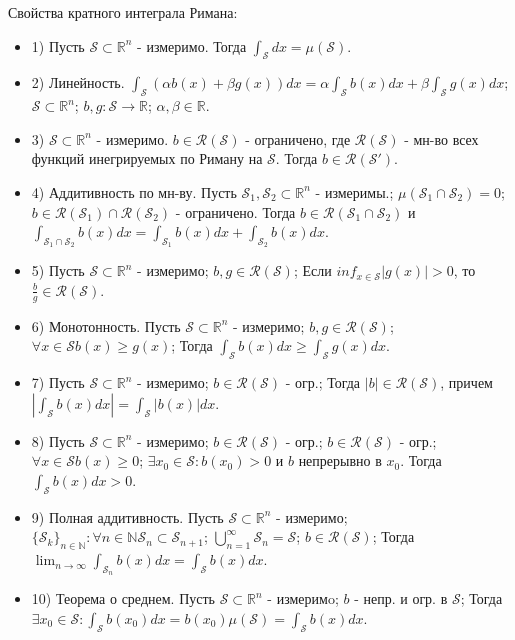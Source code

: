 \documentclass[unicode,10pt, landscape]{article}
\begin{document}
\begin{multicols}{4}
 Свойства кратного интеграла Римана:
 \begin{itemize}
  \item 1) Пусть $\mathcal{S} \subset \mathbb{R}^n$ - измеримо. Тогда $\int_{\mathcal{S}}dx = \mu(\mathcal{S})$.
  \item 2) Линейность. $\int_{\mathcal{S}}(\alpha b(x) + \beta g(x))dx = \alpha\int_\mathcal{S}b(x)dx + \beta\int_\mathcal{S}g(x)dx$; $\mathcal{S} \subset \mathbb{R}^n$; $b,g: \mathcal{S} \to \mathbb{R}$; $\alpha, \beta \in \mathbb{R}$.
  \item 3) $\mathcal{S} \subset \mathbb{R}^n$ - измеримо. $b \in \mathcal{R}(\mathcal{S})$ - ограничено, где $\mathcal{R}(\mathcal{S})$ - мн-во всех функций инегрируемых по Риману на $\mathcal{S}$. Тогда $b \in \mathcal{R}(\mathcal{S}')$.
  \item 4) Аддитивность по мн-ву. Пусть $\mathcal{S}_1, \mathcal{S}_2 \subset \mathbb{R}^n$ - измеримы.; $\mu(\mathcal{S}_1 \cap \mathcal{S}_2) = 0$; $b \in \mathcal{R}(\mathcal{S}_1) \cap \mathcal{R}(\mathcal{S}_2)$ - ограничено. Тогда $b \in \mathcal{R}(\mathcal{S}_1 \cap \mathcal{S}_2)$ и $\int_{\mathcal{S}_1 \cap \mathcal{S}_2}b(x)dx = \int_{\mathcal{S}_1}b(x)dx + \int_{\mathcal{S}_2}b(x)dx$.
  \item 5) Пусть $\mathcal{S} \subset \mathbb{R}^n$ - измеримо; $b, g \in \mathcal{R}(\mathcal{S})$; Если $inf_{x \in \mathcal{S}} |g(x)| > 0$, то $\frac{b}{g} \in \mathcal{R}(\mathcal{S})$.
  \item 6) Монотонность. Пусть $\mathcal{S} \subset \mathbb{R}^n$ - измеримо; $b, g \in \mathcal{R}(\mathcal{S})$; $\forall x \in \mathcal{S}  b(x) \geq g(x)$; Тогда $\int_\mathcal{S}b(x)dx \geq \int_\mathcal{S}g(x)dx$.
  \item 7) Пусть $\mathcal{S} \subset \mathbb{R}^n$ - измеримо; $b \in \mathcal{R}(\mathcal{S})$ - огр.; Тогда $|b| \in \mathcal{R}(\mathcal{S})$, причем $|\int_\mathcal{S}b(x)dx| = \int_\mathcal{S}|b(x)|dx$.
  \item 8)  Пусть $\mathcal{S} \subset \mathbb{R}^n$ - измеримо; $b \in \mathcal{R}(\mathcal{S})$ - огр.; $b \in \mathcal{R}(\mathcal{S})$ - огр.; $\forall x \in \mathcal{S}  b(x) \geq 0$; $\exists x_0 \in \mathcal{S}: b(x_0) > 0$ и $b$ непрерывно в $x_0$. Тогда $\int_\mathcal{S}b(x)dx > 0$.
  \item 9) Полная аддитивность.  Пусть $\mathcal{S} \subset \mathbb{R}^n$ - измеримо; $\{\mathcal{S}_k\}_{n\in\mathbb{N}} : \forall n \in \mathbb{N} \mathcal{S}_n \subset \mathcal{S}_{n+1}$; $\bigcup_{n=1}^\infty \mathcal{S}_n = \mathcal{S}$; $b \in \mathcal{R}(\mathcal{S})$; Тогда $\lim_{n \to \infty} \int_{\mathcal{S}_n} b(x)dx = \int_{\mathcal{S}} b(x)dx$.
  \item 10) Теорема о среднем.  Пусть $\mathcal{S} \subset \mathbb{R}^n$ - измеримo; $b$ - непр. и огр. в $\mathcal{S}$; Тогда $\exists x_0 \in \mathcal{S}: \int_\mathcal{S} b(x_0)dx = b(x_0)\mu(\mathcal{S}) = \int_{\mathcal{S}} b(x)dx$.
 \end{itemize}


\end{multicols}
\end{document}
